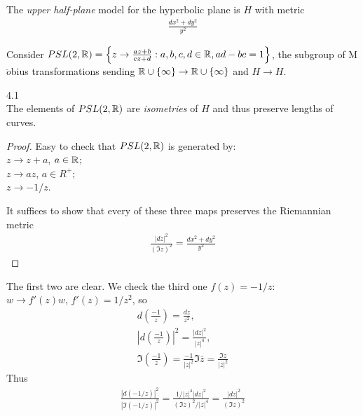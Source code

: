 \documentclass[a4paper]{article}
\begin{document}
\begin{defi}
The \emph{upper half-plane} model for the hyperbolic plane is $H$ with metric
\begin{equation*}
\begin{aligned}
\frac{dx^2+dy^2}{y^2}
\end{aligned}
\end{equation*}
\end{defi}
Consider $PSL(2,\mathbb{R}) = \left\{z \to \frac{az+b}{cz+d}:a,b,c,d \in \mathbb{R},ad-bc = 1\right\}$, the subgroup of M$\ddot{o}$bius transformations sending $\mathbb{R} \cup \{\infty\} \to \mathbb{R} \cup \{\infty\}$ and $H \to H$.

\begin{prop} 4.1\\
The elements of $PSL(2,\mathbb{R})$ are \emph{isometries} of $H$ and thus preserve lengths of curves.
\begin{proof}
Easy to check that $PSL(2,\mathbb{R})$ is generated by:\\
$z \to z+a$, $a \in \mathbb{R}$;\\
$z \to az$, $a\in R^+$;\\
$z \to -1/z$.

It suffices to show that every of these three maps preserves the Riemannian metric
\begin{equation*}
\begin{aligned}
\frac{|dz|^2}{(\Im z)^2} = \frac{dx^2+dy^2}{y^2}
\end{aligned}
\end{equation*}
\end{proof}
\end{prop}

The first two are clear. We check the third one $f(z) = -1/z$:\\
$w \to f'(z)w$, $f'(z) = 1/z^2$, so
\begin{equation*}
\begin{aligned}
d\left(\frac{-1}{z}\right) = \frac{dz}{z^2},\\
\left|d\left(\frac{-1}{z}\right)\right|^2 = \frac{|dz|^2}{|z|^4},\\
\Im \left(\frac{-1}{z}\right) = \frac{-1}{|z|^2} \Im \bar{z} = \frac{\Im z}{|z|^2}
\end{aligned}
\end{equation*}
Thus
\begin{equation*}
\begin{aligned}
\frac{|d(-1/z)|^2}{|\Im (-1/z)|^2} = \frac{1/|z|^4 |dz|^2}{(\Im z)^2 / |z|^4} = \frac{|dz|^2}{(\Im z)^2}
\end{aligned}
\end{equation*}
\end{document}
